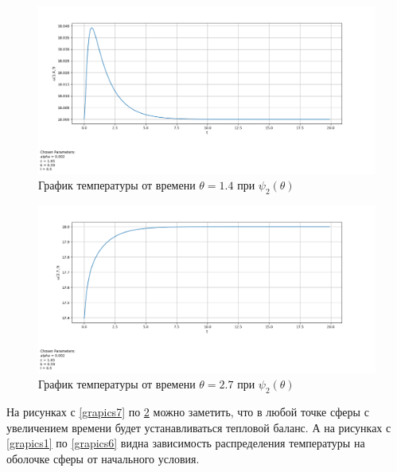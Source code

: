 {{\begin{figure}[H]
    \centering                             
	\includegraphics[width=\textwidth,height=\textheight,keepaspectratio]{pos/var_2_z_1t4.png}                 
	\caption{ График температуры от времени $\theta=1.4$ при $\psi_2(\theta)$}
	\label{grapics11}                           
\end{figure}                                  

\begin{figure}[H]
    \centering                             
	\includegraphics[width=\textwidth,height=\textheight,keepaspectratio]{pos/var_2_z_2t7.png}                 
	\caption{ График температуры от времени $\theta=2.7$ при $\psi_2(\theta)$}
	\label{grapics12}                           
\end{figure}              
                         
                     
    На рисунках с \ref{grapics7} по \ref{grapics12} можно заметить, что в любой точке сферы с увеличением времени
    будет устанавливаться тепловой баланс. А на рисунках с \ref{grapics1} по  \ref{grapics6} видна зависимость распределения температуры на оболочке сферы от начального условия. 
    
}


}
